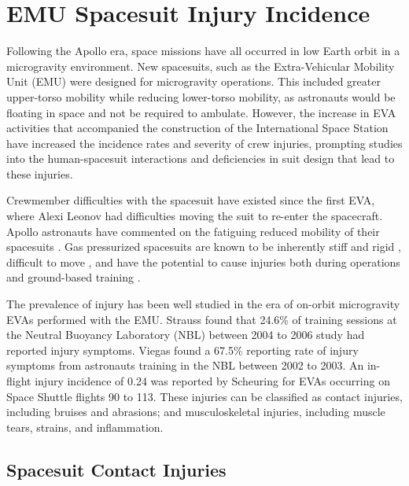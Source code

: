 \documentclass[defaultstyle,11pt]{thesis}
\begin{document}
\hypertarget{emu-spacesuit-injury-incidence}{%
\section{EMU Spacesuit Injury Incidence}\label{emu-spacesuit-injury-incidence}}

Following the Apollo era, space missions have all occurred in low Earth orbit in a microgravity environment.
New spacesuits, such as the Extra-Vehicular Mobility Unit (EMU) were designed for microgravity operations.
This included greater upper-torso mobility while reducing lower-torso mobility, as astronauts would be floating in space and not be required to ambulate.
However, the increase in EVA activities that accompanied the construction of the International Space Station have increased the incidence rates and severity of crew injuries, prompting studies into the human-spacesuit interactions and deficiencies in suit design that lead to these injuries.

Crewmember difficulties with the spacesuit have existed since the first EVA, where Alexi Leonov had difficulties moving the suit to re-enter the spacecraft.
Apollo astronauts have commented on the fatiguing reduced mobility of their spacesuits \citep{Scheuring2008}.
Gas pressurized spacesuits are known to be inherently stiff and rigid \citep{Parry1966, Abramov1994, Schmidt2001a, Holschuh2009}, difficult to move \citep{Norcross2009, Amick2015}, and have the potential to cause injuries both during operations and ground-based training \citep{Williams2003, Strauss2004, Scheuring2008, Scheuring2009, Anderson2015a, Chappell2017}.

The prevalence of injury has been well studied in the era of on-orbit microgravity EVAs performed with the EMU.
Strauss \citep{Strauss2004} found that 24.6\% of training sessions at the Neutral Buoyancy Laboratory (NBL) between 2004 to 2006 study had reported injury symptoms.
Viegas \citep{Viegas2004} found a 67.5\% reporting rate of injury symptoms from astronauts training in the NBL between 2002 to 2003.
An in-flight injury incidence of 0.24 was reported by Scheuring \citep{Scheuring2012} for EVAs occurring on Space Shuttle flights 90 to 113.
These injuries can be classified as contact injuries, including bruises and abrasions; and musculoskeletal injuries, including muscle tears, strains, and inflammation.

\hypertarget{spacesuit-contact-injuries}{%
\subsection{Spacesuit Contact Injuries}\label{spacesuit-contact-injuries}}
\end{document}
